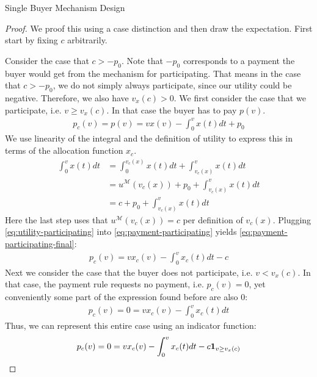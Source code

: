 \documentclass[11pt,a4paper]{article}
\newcommand{\1}[1]{\mbox{\rm\bf 1}_{#1}}
\begin{document}
\begin{section}{Single Buyer Mechanism Design}
 \begin{proof}
     We proof this using a case distinction and then draw the expectation.
     First start by fixing $c$ arbitrarily.

     Consider the case that $c > -p_0$. Note that $-p_0$ corresponds to a payment the buyer would get from the mechanism for participating.
     That means in the case that $c > -p_0$, we do not simply always participate, since our utility could be negative. Therefore, we also have $v_x(c) > 0$.
     We first consider the case that we participate, i.e. $v \geq v_x(c)$.
     In that case the buyer has to pay $p(v)$.
     \begin{align}
         \label{eq:payment-participating}
         p_c(v) = p(v) = v x(v) - \int_0^v x(t) dt + p_0
     \end{align}
     We use linearity of the integral and the definition of utility to express this in terms of the allocation function $x_c$.
     \begin{equation}
         \label{eq:utility-participating}
         \begin{aligned}
             \int_0^v x(t) dt & = \int_0^{v_c(x)} x(t) dt + \int_{v_c(x)}^v x(t) dt     \\
                              & = u^\mathcal{M}(v_c(x)) + p_0 + \int_{v_c(x)}^v x(t) dt \\
                              & = c + p_0 + \int_{v_c(x)}^v x(t) dt
         \end{aligned}
     \end{equation}
     Here the last step uses that $u^\mathcal{M}(v_c(x)) = c$ per definition of $v_c(x)$.
     Plugging \autoref{eq:utility-participating} into \autoref{eq:payment-participating} yields \autoref{eq:payment-participating-final}:
     \begin{align}
         \label{eq:payment-participating-final}
         p_c(v) = v x_c(v) - \int_0^v x_c(t) dt - c
     \end{align}
     Next we consider the case that the buyer does not participate, i.e. $v < v_x(c)$.
     In that case, the payment rule requests no payment, i.e. $p_c(v) = 0$, yet conveniently some part of the expression found before are also $0$:
     \begin{align*}
         p_c(v) = 0 = v x_c(v) - \int_0^v x_c(t) dt
     \end{align*}
     Thus, we can represent this entire case using an indicator function:
     \begin{align*}
         p_c(v) = 0 = v x_c(v) - \int_0^v x_c(t) dt - c \1{v \geq v_x(c)}

\end{align*}
\end{proof}
\end{section}
\end{document}

